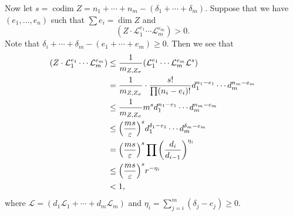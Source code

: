 \documentclass[leqno, openany]{memoir}
\theoremstyle{definition}
\theoremstyle{remark}
\theoremstyle{plain}
\theoremstyle{definition}
\theoremstyle{remark}
\newcommand{\ep}{\varepsilon}
\newcommand{\mc}[1]{\mathcal{#1}}
\newcommand{\on}[1]{\operatorname{#1}}
\begin{document}
Now let $s = \on{codim} Z = n_1 + \cdots + n_m - (\delta_1 + \cdots + \delta_m)$. Suppose that we have $(e_1, \ldots, e_n)$ such that $\sum e_i = \dim Z$ and
\[ (Z \cdot \mc{L}_1^{e_1} \cdots \mc{L}_m^{e_m}) > 0. \]
Note that $\delta_i + \cdots + \delta_m - (e_1 + \cdots + e_m) \geq 0$. Then we see that
\begin{align*}
    (Z \cdot \mc{L}_1^{e_1} \cdots \mc{L}_m^{e_m}) &\leq \frac{1}{m_{Z, Z_{\sigma}}} (\mc{L}_1^{e_1} \cdots \mc{L}_m^{e_m} \mc{L}^s) \\
    &= \frac{1}{m_{Z, Z_{\sigma}}} \cdot \frac{s!}{\prod (n_i - e_i)!} d_1^{n_1 - e_1} \cdots d_m^{n_m - e_m} \\
    &\leq \frac{1}{m_{Z, Z_{\sigma}}} m^s d_1^{n_1 - e_1} \cdots d_m^{n_m - e_m} \\
    &\leq \qty(\frac{ms}{\ep})^s d_1^{\delta_1 - e_1} \cdots d_m^{\delta_m - e_m} \\
    &= \qty(\frac{ms}{\ep})^s \prod \qty(\frac{d_i}{d_{i-1}})^{\eta_i} \\
    &\leq \qty(\frac{ms}{\ep})^s r^{-\eta_i} \\
    &< 1,
\end{align*}
where $\mc{L} = (d_1 \mc{L}_1 + \cdots + d_m \mc{L}_m)$ and $\eta_i = \sum_{j=i}^m (\delta_j - e_j) \geq 0$.
\end{document}
